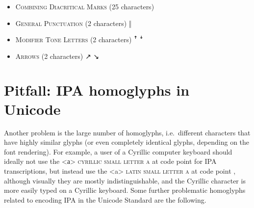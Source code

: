 \begin{itemize}[itemsep=4pt]
	\item \textsc{Combining Diacritical Marks} (25 characters) \newline 
	       
	       
	       
	   \ 
    \item \textsc{General Punctuation} (2 characters) \newline 
    ‖ 
	\item \textsc{Modifier Tone Letters} (2 characters) \newline
	{\large{}ꜛ ꜜ}
	\item \textsc{Arrows} (2 characters) \newline 
	↗ ↘

\end{itemize}

\section{Pitfall: IPA homoglyphs in Unicode}
\label{pitfall-ipa-homoglyphs}

Another problem is the large number of homoglyphs, i.e.~different characters
that have highly similar glyphs (or even completely identical glyphs, depending
on the font rendering). For example, a user of a Cyrillic computer keyboard
should ideally not use the <а> \textsc{cyrillic small letter a} at code point
 for IPA transcriptions, but instead use the <a> \textsc{latin small
letter a} at code point , although visually they are mostly
indistinguishable, and the Cyrillic character is more easily typed on a Cyrillic
keyboard. Some further problematic homoglyphs related to encoding IPA in the
Unicode Standard are the following.


